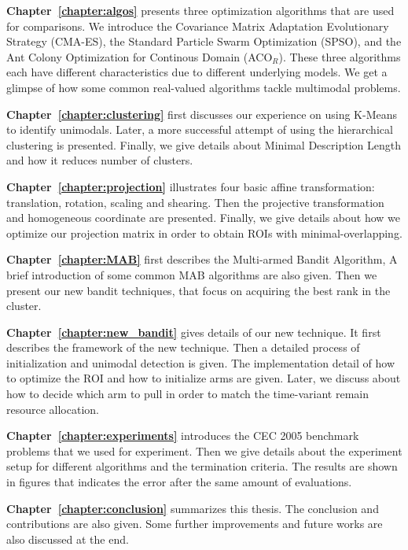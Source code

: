 \textbf{Chapter~\ref{chapter:algos}} presents three optimization algorithms that are used for comparisons.
We introduce 
the Covariance Matrix Adaptation Evolutionary Strategy (CMA-ES),
the Standard Particle Swarm Optimization (SPSO), and
the Ant Colony Optimization for Continous Domain (ACO$_R$).
These three algorithms each have different characteristics due to different underlying models.
We get a glimpse of how some common real-valued algorithms tackle multimodal problems. 


\textbf{Chapter~\ref{chapter:clustering}} first discusses our experience on using K-Means to identify unimodals.
Later, a more successful attempt of using the hierarchical clustering is presented.
Finally, we give details about Minimal Description Length and how it reduces number of clusters.

\textbf{Chapter~\ref{chapter:projection}} illustrates four basic affine transformation: translation, rotation, scaling and shearing.
Then the projective transformation and homogeneous coordinate are presented.
Finally, we give details about how we optimize our projection matrix in order to obtain ROIs with minimal-overlapping.


\textbf{Chapter~\ref{chapter:MAB}} first describes the Multi-armed Bandit Algorithm, 
A brief introduction of some common MAB algorithms are also given.
Then we present our new bandit techniques, that focus on acquiring the best rank in the cluster.


\textbf{Chapter~\ref{chapter:new_bandit}} gives details of our new technique.
It first describes the framework of the new technique.
Then a detailed process of initialization and unimodal detection is given.
The implementation detail of how to optimize the ROI and how to initialize arms are given.
Later, we discuss about how to decide which arm to pull in order to match the time-variant remain resource allocation.

\textbf{Chapter~\ref{chapter:experiments}} introduces the CEC 2005 benchmark problems that we used for experiment.
Then we give details about the experiment setup for different algorithms and the termination criteria.
The results are shown in figures that indicates the error after the same amount of evaluations.

\textbf{Chapter~\ref{chapter:conclusion}} summarizes this thesis. 
The conclusion and contributions are also given.
Some further improvements and future works are also discussed at the end.



